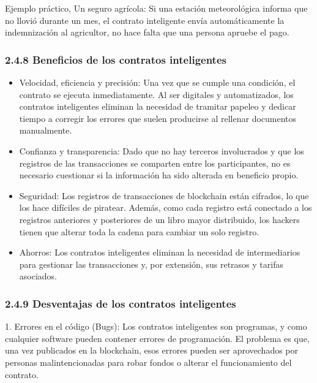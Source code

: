 \documentclass[12pt,a4paper]{article}
\begin{document}
Ejemplo práctico, Un seguro agrícola: Si una estación meteorológica informa que no llovió
durante un mes, el contrato inteligente envía automáticamente la indemnización al
agricultor, no hace falta que una persona apruebe el pago.

\subsubsection*{2.4.8 Beneficios de los contratos inteligentes}

\begin{itemize}
    \item Velocidad, eficiencia y precisión: Una vez que se cumple una condición, el contrato
    se ejecuta inmediatamente. Al ser digitales y automatizados, los contratos
    inteligentes eliminan la necesidad de tramitar papeleo y dedicar tiempo a corregir los
    errores que suelen producirse al rellenar documentos manualmente.

    \item Confianza y transparencia: Dado que no hay terceros involucrados y que los
    registros de las transacciones se comparten entre los participantes, no es necesario
    cuestionar si la información ha sido alterada en beneficio propio.

    \item Seguridad: Los registros de transacciones de blockchain están cifrados, lo que los
    hace difíciles de piratear. Además, como cada registro está conectado a los registros
    anteriores y posteriores de un libro mayor distribuido, los hackers tienen que alterar
    toda la cadena para cambiar un solo registro.

    \item Ahorros: Los contratos inteligentes eliminan la necesidad de intermediarios para
    gestionar las transacciones y, por extensión, sus retrasos y tarifas asociados.
\end{itemize}

\subsubsection*{2.4.9 Desventajas de los contratos inteligentes}

1. Errores en el código (Bugs): Los contratos inteligentes son programas, y como cualquier
software pueden contener errores de programación. El problema es que, una vez
publicados en la blockchain, esos errores pueden ser aprovechados por personas
malintencionadas para robar fondos o alterar el funcionamiento del contrato.
\end{document}
